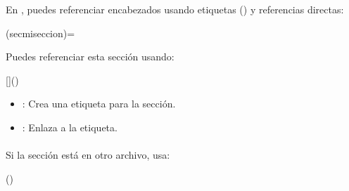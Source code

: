 \documentclass[a4paper,10pt,spanish]{sphinxmanual}
\begin{document}
\subsubsection{}
\label{\detokenize{configuracion_inicial/013.guia_de_myst_parser:referencias-cruzadas-a-secciones}}

\paragraph{}
\label{\detokenize{configuracion_inicial/013.guia_de_myst_parser:id6}}
\sphinxAtStartPar
En , puedes referenciar encabezados usando etiquetas (\sphinxcode{\sphinxupquote{\#}}) y referencias directas:

\begin{sphinxVerbatim}[commandchars=\\\{\}]
(sec\PYGZhy{}mi\PYGZhy{}seccion)=

Puedes referenciar esta sección usando:

[]()
\end{sphinxVerbatim}
\begin{itemize}
\item {} 
\sphinxAtStartPar
{}: Crea una etiqueta para la sección.

\item {} 
\sphinxAtStartPar
{}: Enlaza a la etiqueta.

\end{itemize}


\paragraph{}
\label{\detokenize{configuracion_inicial/013.guia_de_myst_parser:referencia-desde-otro-archivo}}
\sphinxAtStartPar
Si la sección está en otro archivo, usa:

\begin{sphinxVerbatim}()
\end{sphinxVerbatim}
\end{document}
